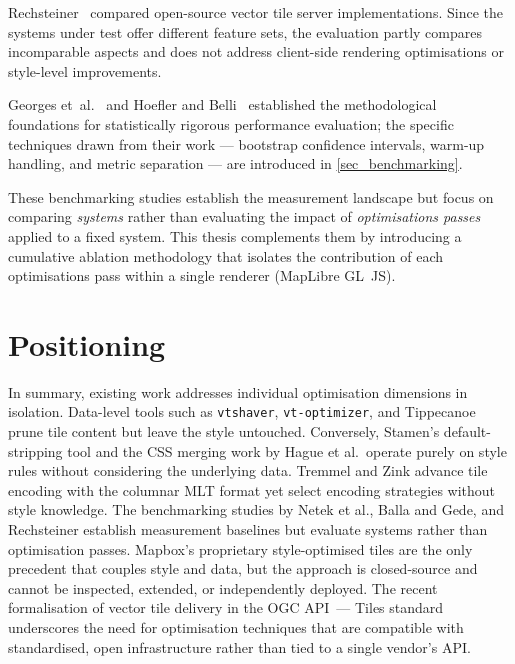 \begin{sloppypar}
Rechsteiner~\cite{rechsteinerPerformancevergleichOpenSourceVectorTilesServerloesungenZur2024} compared open-source vector tile server implementations.
Since the systems under test offer different feature sets, the evaluation partly compares incomparable aspects and does not address client-side rendering optimisations or style-level improvements.
\end{sloppypar}

Georges et~al.~\cite{georgesStatisticallyRigorousJava2007} and Hoefler and Belli~\cite{hoeflerScientificBenchmarkingParallel2015} established the methodological foundations for statistically rigorous performance evaluation; the specific techniques drawn from their work --- bootstrap confidence intervals, warm-up handling, and metric separation --- are introduced in \cref{sec_benchmarking}.

These benchmarking studies establish the measurement landscape but focus on comparing \emph{systems} rather than evaluating the impact of \emph{optimisations passes} applied to a fixed system.
This thesis complements them by introducing a cumulative ablation methodology that isolates the contribution of each optimisations pass within a single renderer (MapLibre GL~JS).

\section{Positioning}\label{sec_rw_positioning}

In summary, existing work addresses individual optimisation dimensions in isolation.
Data-level tools such as \texttt{vtshaver}, \texttt{vt-optimizer}, and Tippecanoe prune tile content but leave the style untouched.
Conversely, Stamen's default-stripping tool and the CSS merging work by Hague et al.\ operate purely on style rules without considering the underlying data.
Tremmel and Zink advance tile encoding with the columnar MLT format yet select encoding strategies without style knowledge.
The benchmarking studies by Netek et al., Balla and Gede, and Rechsteiner establish measurement baselines but evaluate systems rather than optimisation passes.
Mapbox's proprietary style-optimised tiles are the only precedent that couples style and data, but the approach is closed-source and cannot be inspected, extended, or independently deployed.
The recent formalisation of vector tile delivery in the OGC API~--- Tiles standard~\cite{ogcApiTiles2022} underscores the need for optimisation techniques that are compatible with standardised, open infrastructure rather than tied to a single vendor's API.

